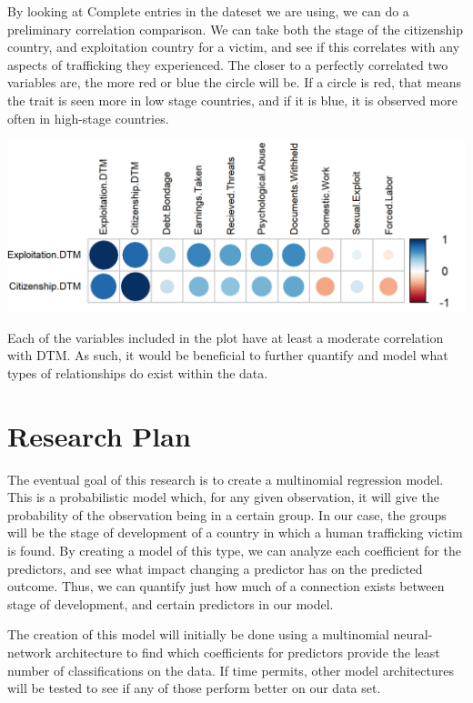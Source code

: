\documentclass{article} %
\begin{document}
By looking at Complete entries in the dateset we are using, we can do a preliminary correlation comparison. We can take both the stage of the citizenship country, and exploitation country for a victim, and see if this correlates with any aspects of trafficking they experienced. The closer to a perfectly correlated two variables are, the more red or blue the circle will be. If a circle is red, that means the trait is seen more in low stage countries, and if it is blue, it is observed more often in high-stage countries.

\hspace*{-1.5cm}
\includegraphics{Corrplot} \bigskip

Each of the variables included in the plot have at least a moderate correlation with DTM. As such, it would be beneficial to further quantify and model what types of relationships do exist within the data.


\section{Research Plan}

The eventual goal of this research is to create a multinomial regression model. This is a probabilistic model which, for any given observation, it will give the probability of the observation being in a certain group. In our case, the groups will be the stage of development of a country in which a human trafficking victim is found. By creating a model of this type, we can analyze each coefficient for the predictors, and see what impact changing a predictor has on the predicted outcome. Thus, we can quantify just how much of a connection exists between stage of development, and certain predictors in our model.

The creation of this model will initially be done using a multinomial neural-network architecture to find which coefficients for predictors provide the least number of classifications on the data. If time permits, other model architectures will be tested to see if any of those perform better on our data set.
\end{document}
